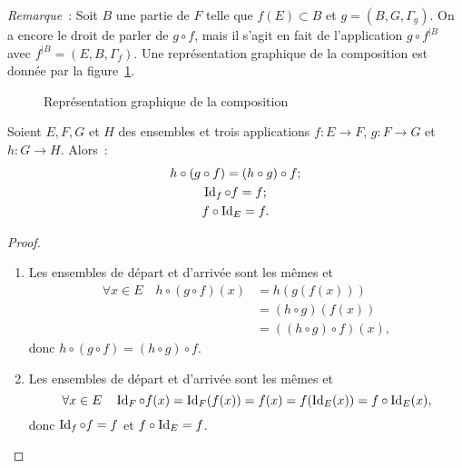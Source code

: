 \emph{Remarque}~: Soit \(B\) une partie de \(F\) telle que \(f(E) \subset B\) et \(g=(B,G,\Gamma_g)\). On a encore le droit de parler de \(g \circ f\), mais il s'agit en fait de l'application \(g \circ f^{|B}\) avec \( f^{|B} =(E,B,\Gamma_f)\).
Une représentation graphique de la composition est donnée par la figure~\ref{chap3-fig:compose}.
%
\begin{figure}
  \centering
  \caption{Représentation graphique de la composition}
  \label{chap3-fig:compose}
\end{figure}
%
\begin{prop}
  Soient \(E,F,G\) et \(H\) des ensembles et trois applications \(f:E \longrightarrow F\), \(g:F \longrightarrow G\) et \(h:G \longrightarrow H\). Alors~:
  \begin{gather}
  h \circ (g \circ f)=(h \circ g) \circ f;\\
  \operatorname{Id}_f \circ f = f;\\
  f \circ \operatorname{Id}_E=f.
  \end{gather}
\end{prop}
\begin{proof}
  \begin{enumerate}
  \item Les ensembles de départ et d'arrivée sont les mêmes et 
    \begin{align}
      \forall x \in E \quad h \circ (g \circ f)(x) &=h(g(f(x))) \\ 
      &=(h \circ g)(f(x)) \\ 
      &=((h \circ g) \circ f)(x),
    \end{align}
    donc \(h \circ (g \circ f)=(h \circ g) \circ f\).
  \item Les ensembles de départ et d'arrivée sont les mêmes et 
    \begin{equation}
      \forall x \in E \quad \operatorname{Id}_F \circ f(x)=\operatorname{Id}_F(f(x))=f(x)=f(\operatorname{Id}_E(x))=f \circ \operatorname{Id}_E(x),
    \end{equation}
    donc \(\operatorname{Id}_f \circ f = f\) et \(f \circ \operatorname{Id}_E=f\).
  \end{enumerate}
\end{proof}

